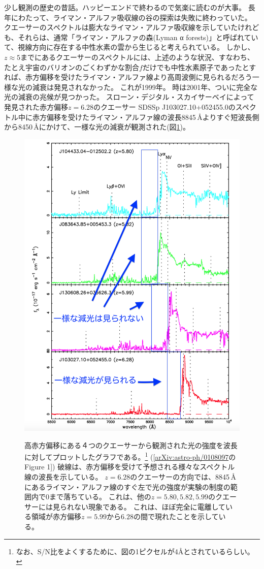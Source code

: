 \documentclass[11pt]{ltjsarticle}
\theoremstyle{plain}
\theoremstyle{break}
\begin{document}
少し観測の歴史の昔話。ハッピーエンドで終わるので気楽に読むのが大事。
長年にわたって、ライマン・アルファ吸収線の谷の探索は失敗に終わっていた。
クエーサーのスペクトルは膨大なライマン・アルファ吸収線を示していたけれども、それらは、通常「ライマン・アルファの森(Lyman α forests)」と呼ばれていて、視線方向に存在する中性水素の雲から生じると考えられている。
しかし、$z \approx 5$までにあるクエーサーのスペクトルには、上述のような状況、すなわち、たとえ宇宙のバリオンのごくわずかな割合$f$だけでも中性水素原子であったとすれば、赤方偏移を受けたライマン・アルファ線より高周波側に見られるだろう一様な光の減衰は発見されなかった。
これが1999年。
時は2001年、ついに完全な光の減衰の兆候が見つかった。
スローン・デジタル・スカイサーベイによって発見された赤方偏移$z =6.28$のクエーサー SDSSp J103027.10+052455.0のスペクトル中に赤方偏移を受けたライマン・アルファ線の波長8845\,{\AA}よりすぐ短波長側から8450\,{\AA}にかけて、一様な光の減衰が観測された(図\ref{fig:1-8})。
\begin{figure}[H]
\centering
\includegraphics[width=13cm]{figure/fig1-8}
\label{fig:1-8}
\centering
\caption{高赤方偏移にある４つのクエーサーから観測された光の強度を波長に対してプロットしたグラフである。\footnote{なお、S/N比をよくするために、図の1ピクセルが4{\AA}とされているらしい。}
([\href{https://arxiv.org/abs/astro-ph/0108097}{arXiv:astro-ph/0108097}のFigure 1])
破線は、赤方偏移を受けて予想される様々なスペクトル線の波長を示している。
$z=6.28$のクエーサーの方向では、8845\,{\AA}にあるライマン・アルファ線のすぐ左で光の強度が実験の制度の範囲内で0まで落ちている。
これは、他の$z = 5.80,5.82,5.99$のクエーサーには見られない現象である。
これは、ほぼ完全に電離している領域が赤方偏移$z = 5.99 から 6.28$の間で現れたことを示している。
}%
\end{figure}%
\end{document}
